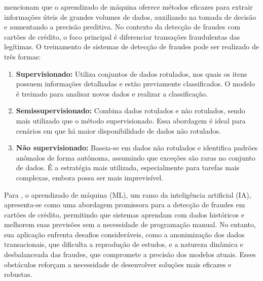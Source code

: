 \documentclass[12pt,a4paper]{article}
\begin{document}
\cite{gupta2020} mencionam que o aprendizado de máquina oferece métodos eficazes para extrair informações úteis de grandes volumes de dados, auxiliando na tomada de decisão e aumentando a precisão preditiva. No contexto da detecção de fraudes com cartões de crédito, o foco principal é diferenciar transações fraudulentas das legítimas. O treinamento de sistemas de detecção de fraudes pode ser realizado de três formas:
\begin{enumerate}
    \item \textbf{Supervisionado:} Utiliza conjuntos de dados rotulados, nos quais os itens possuem informações detalhadas e estão previamente classificados. O modelo é treinado para analisar novos dados e realizar a classificação.
    \item \textbf{Semissupervisionado:} Combina dados rotulados e não rotulados, sendo mais utilizado que o método supervisionado. Essa abordagem é ideal para cenários em que há maior disponibilidade de dados não rotulados.
    \item \textbf{Não supervisionado:} Baseia-se em dados não rotulados e identifica padrões anômalos de forma autônoma, assumindo que exceções são raras no conjunto de dados. É a estratégia mais utilizada, especialmente para tarefas mais complexas, embora possa ser mais imprevisível.
\end{enumerate}

Para \cite{bhati2024}, o aprendizado de máquina (ML), um ramo da inteligência artificial (IA), apresenta-se como uma abordagem promissora para a detecção de fraudes em cartões de crédito, permitindo que sistemas aprendam com dados históricos e melhorem suas previsões sem a necessidade de programação manual. No entanto, sua aplicação enfrenta desafios consideráveis, como a anonimização dos dados transacionais, que dificulta a reprodução de estudos, e a natureza dinâmica e desbalanceada das fraudes, que compromete a precisão dos modelos atuais. Esses obstáculos reforçam a necessidade de desenvolver soluções mais eficazes e robustas.


\newpage

\end{document}
